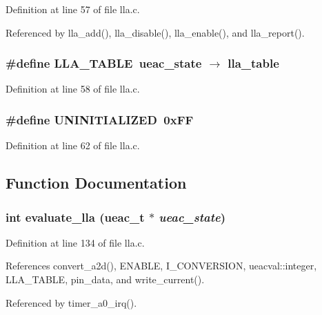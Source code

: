 Definition at line 57 of file lla.c.

Referenced by lla\_\-add(), lla\_\-disable(), lla\_\-enable(), and lla\_\-report().
\subsubsection{\setlength{\rightskip}{0pt plus 5cm}\#define LLA\_\-TABLE~{\bf ueac\_\-state} $\rightarrow$ lla\_\-table}\label{lla_8c_a1}




Definition at line 58 of file lla.c.
\subsubsection{\setlength{\rightskip}{0pt plus 5cm}\#define UNINITIALIZED~0x\-FF}\label{lla_8c_a4}




Definition at line 62 of file lla.c.

\subsection{Function Documentation}
\subsubsection{\setlength{\rightskip}{0pt plus 5cm}int evaluate\_\-lla ({\bf ueac\_\-t} $\ast$ {\em ueac\_\-state})}\label{lla_8c_a9}




Definition at line 134 of file lla.c.

References convert\_\-a2d(), ENABLE, I\_\-CONVERSION, ueacval::integer, LLA\_\-TABLE, pin\_\-data, and write\_\-current().

Referenced by timer\_\-a0\_\-irq().

